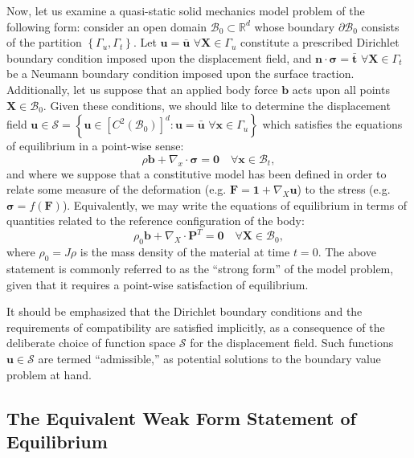Now, let us examine a quasi-static solid mechanics model problem of the following form: consider an open domain $\mathcal{B}_0 \subset \mathbb{R}^d$ whose boundary $\partial \mathcal{B}_0$ consists of the partition $\left\{ \Gamma_u, \Gamma_t \right\}$. Let $\mathbf{u} = \bar{\mathbf{u}} \, \, \forall \mathbf{X} \in \Gamma_u$ constitute a prescribed Dirichlet boundary condition imposed upon the displacement field, and $\mathbf{n} \cdot \boldsymbol{\sigma} = \bar{\mathbf{t}} \, \, \forall \mathbf{X} \in \Gamma_t$ be a Neumann boundary condition imposed upon the surface traction. Additionally, let us suppose that an applied body force $\mathbf{b}$ acts upon all points $\mathbf{X} \in \mathcal{B}_0$. Given these conditions, we should like to determine the displacement field $\mathbf{u} \in \mathcal{S} = \left\{ \mathbf{u} \in \left[ C^2 (\mathcal{B}_0) \right]^d \colon \mathbf{u} = \bar{\mathbf{u}} \, \, \forall \mathbf{x} \in \Gamma_u \right\}$ which satisfies the equations of equilibrium in a point-wise sense:
\begin{equation}
  \rho \mathbf{b} + \nabla_x \cdot \boldsymbol{\sigma} = \mathbf{0} \quad \forall \mathbf{x} \in \mathcal{B}_t,
\end{equation}
and where we suppose that a constitutive model has been defined in order to relate some measure of the deformation (e.g. $\mathbf{F} = \mathbf{1} + \nabla_X \mathbf{u}$) to the stress (e.g. $\boldsymbol{\sigma} = f (\mathbf{F})$). Equivalently, we may write the equations of equilibrium in terms of quantities related to the reference configuration of the body:
\begin{equation}
  \rho_0 \mathbf{b} + \nabla_X \cdot \mathbf{P}^T = \mathbf{0} \quad \forall \mathbf{X} \in \mathcal{B}_0,
\end{equation}
where $\rho_0 = J \rho$ is the mass density of the material at time $t = 0$. The above statement is commonly referred to as the ``strong form'' of the model problem, given that it requires a point-wise satisfaction of equilibrium.

It should be emphasized that the Dirichlet boundary conditions and the requirements of compatibility are satisfied implicitly, as a consequence of the deliberate choice of function space $\mathcal{S}$ for the displacement field. Such functions $\mathbf{u} \in \mathcal{S}$ are termed ``admissible,'' as potential solutions to the boundary value problem at hand.

\subsection{The Equivalent Weak Form Statement of Equilibrium}

